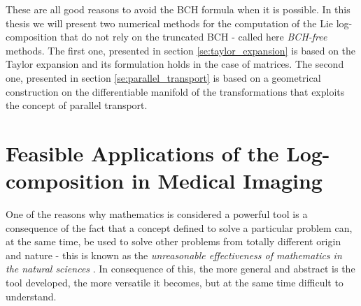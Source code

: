 These are all good reasons to avoid the BCH formula when it is possible. In this thesis we will present two numerical methods for the computation of the Lie log-composition that do not rely on the truncated BCH - called here \emph{BCH-free} methods. The first one, presented in section \ref{se:taylor_expansion} is based on the Taylor expansion and its formulation holds in the case of matrices. The second one, presented in section \ref{se:parallel_transport} is based on a geometrical construction on the differentiable manifold of the transformations that exploits the concept of parallel transport. 
%


\section{Feasible Applications of the Log-composition in Medical Imaging}\label{se:applications_log_com_in_med}
One of the reasons why mathematics is considered a powerful tool is a consequence of the fact that a concept defined to solve a particular problem can, at the same time, be used to solve other problems from totally different origin and nature - this is known as the \emph{unreasonable effectiveness of mathematics in the natural sciences} \cite{wigner1960unreasonable}. In consequence of this, the more general and abstract is the tool developed, the more versatile it becomes, but at the same time difficult to understand.

